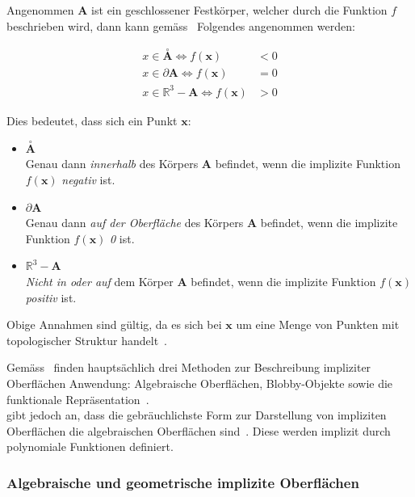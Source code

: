 Angenommen $ \bm{A} $ ist ein geschlossener Festkörper, welcher durch die
Funktion $f$ beschrieben wird, dann kann gemäss~\citeauthor{hart_ray_1993} Folgendes
angenommen werden:

\begin{align} \label{eq:surface_implicit_condition}
    x \in \overset{\circ}{\bm{A}} \Leftrightarrow f(\bm{x}) &< 0 \\
    x \in \partial \bm{A}         \Leftrightarrow f(\bm{x}) &= 0 \\
    x \in \mathbb{R}^{3} - \bm{A} \Leftrightarrow f(\bm{x}) &> 0
\end{align}

Dies bedeutet, dass sich ein Punkt $\bm{x}$:

\begin{itemize}
    \item{$\overset{\circ}{\bm{A}}$}\\
        Genau dann \textit{innerhalb} des Körpers $\bm{A}$ befindet,
        wenn die implizite Funktion $f(\bm{x})$ \textit{negativ} ist.
    \item $\partial{\bm{A}}$\\
        Genau dann \textit{auf der Oberfläche} des Körpers $\bm{A}$
        befindet, wenn die implizite Funktion $f(\bm{x})$ \textit{0}
        ist.
    \item $\mathbb{R}^{3} - \bm{A}$\\
        \textit{Nicht in oder auf} dem Körper $\bm{A}$ befindet, wenn
        die implizite Funktion $f(\bm{x})$ \textit{positiv} ist.
\end{itemize}

Obige Annahmen sind gültig, da es sich bei $ \bm{x} $ um eine Menge von Punkten mit topologischer
Struktur handelt~\parencite[S. 1]{hart_ray_1993}.

Gemäss~\citeauthor{menon_introduction_1996} finden hauptsächlich drei
Methoden zur Beschreibung impliziter Oberflächen Anwendung: Algebraische
Oberflächen, Blobby-Objekte sowie die funktionale
Repräsentation~\parencite[S.  1]{menon_introduction_1996}.\\
\citeauthor{hart_sphere_1994} gibt jedoch an, dass die gebräuchlichste
Form zur Darstellung von impliziten Oberflächen die algebraischen
Oberflächen sind~\parencite[S. 527]{hart_sphere_1994}. Diese werden
implizit durch polynomiale Funktionen definiert.

\subsubsection{Algebraische und geometrische implizite Oberflächen}
\label{ssubsec:implicit_surfaces_algebraic_geometric}

